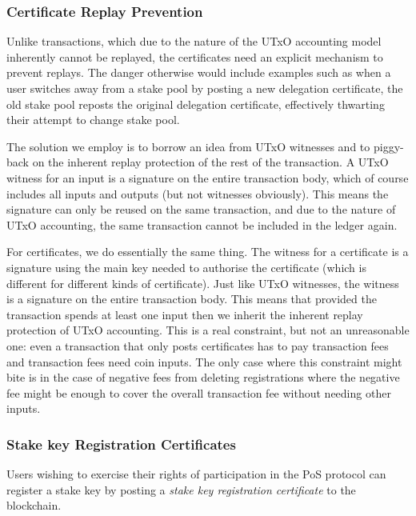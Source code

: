 \documentclass[11pt,a4paper]{article}
\begin{document}
\subsubsection{Certificate Replay Prevention}
\label{certificate-replay-prevention}

Unlike transactions, which due to the nature of the UTxO accounting
model inherently cannot be replayed, the certificates need an explicit
mechanism to prevent replays. The danger otherwise would include
examples such as when a user switches away from a stake pool by posting
a new delegation certificate, the old stake pool reposts the original
delegation certificate, effectively thwarting their attempt to change
stake pool.

The solution we employ is to borrow an idea from UTxO witnesses and to
piggy-back on the inherent replay protection of the rest of the
transaction. A UTxO witness for an input is a signature on the entire
transaction body, which of course includes all inputs and outputs (but
not witnesses obviously). This means the signature can only be reused
on the same transaction, and due to the nature of UTxO accounting, the
same transaction cannot be included in the ledger again.

For certificates, we do essentially the same thing. The witness for a
certificate is a signature using the main key needed to authorise the
certificate (which is different for different kinds of certificate).
Just like UTxO witnesses, the witness is a signature on the entire
transaction body. This means that provided the transaction spends at
least one input then we inherit the inherent replay protection of UTxO
accounting. This is a real constraint, but not an unreasonable one:
even a transaction that only posts certificates has to pay transaction
fees and transaction fees need coin inputs. The only case where this
constraint might bite is in the case of negative fees from deleting
registrations where the negative fee might be enough to cover the
overall transaction fee without needing other inputs.

\subsubsection{Stake key Registration Certificates}
\label{stake-key-registration-certificates}

Users wishing to exercise their rights of participation in the PoS
protocol can register a stake key by posting a \emph{stake key
registration certificate} to the blockchain.
\end{document}
